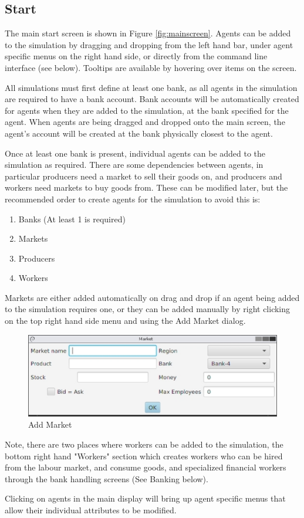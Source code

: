 \documentclass[10pt,oneside,openright, a4paper]{memoir}
\begin{document}
\subsection{Start}
The main start screen is shown in Figure \ref{fig:mainscreen}. Agents
can be added to the simulation by dragging and dropping from the
left hand bar, under agent specific menus on the right hand side, or directly
from the command line interface (see below). Tooltips
are available by hovering over items on the screen.
\par
All simulations must first define at least one  bank, as all agents 
in the simulation are required to have a bank account. Bank accounts will
be automatically created for agents when they are added to the simulation,
at the bank specified for the agent. When agents are being dragged and dropped
onto the main screen, the agent's account will be created at the bank physically closest to the agent.
\par
Once at least one bank is present, individual agents can be added to the simulation as required. There are some dependencies between agents, in 
particular producers need a market to sell their goods on, and producers
and workers need markets to buy goods from. These can be modified later, but 
the recommended order to create agents for the simulation to avoid this is:
\begin{enumerate}
\item Banks (At least 1 is required)
\item Markets 
\item Producers
\item Workers
\end{enumerate}
Markets are either added automatically on drag and drop if an agent
being added to the simulation requires one, or they can be added
manually by right clicking on the top right hand side menu and using
the Add Market dialog.
\begin{figure}[h]
\begin{center}
\includegraphics[width=14cm]{images/fig_addmarket.eps}
\caption{Add Market}
\label{fig:addmarket}
\end{center}
\end{figure}
Note, there are two places where workers can be added to the simulation,
the bottom right hand "Workers" section which creates workers who can
be hired from the labour market, and consume goods, and specialized
financial workers through the bank handling screens (See Banking below).
\par
Clicking on agents in the main display will bring up agent specific menus 
that allow their individual attributes to be modified.
\end{document}
